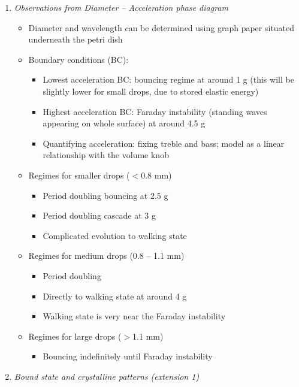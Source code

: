 \begin{enumerate}
\begin{enumerate}
\end{enumerate}


\item\textit{Observations from Diameter -- Acceleration phase diagram \cite{protiere2006particle}}


\begin{itemize}

\item  Diameter and wavelength can be determined using graph paper situated underneath the petri dish

\item  Boundary conditions (BC):
\begin{itemize}
\item  Lowest acceleration BC: bouncing regime at around 1 g (this will be  slightly lower for small drops, due to stored elastic energy)
\item  Highest acceleration BC: Faraday instability (standing waves appearing on whole surface) at around 4.5 g
\item  Quantifying acceleration: fixing treble and bass; model as a linear relationship with the volume knob
\end{itemize}

\item  Regimes for smaller drops ($<$0.8 mm)
\begin{itemize}
\item  Period doubling bouncing at 2.5 g
\item  Period doubling cascade at 3 g
\item  Complicated evolution to walking state
\end{itemize}
\item  Regimes for medium drops (0.8 -- 1.1 mm)
\begin{itemize}
\item  Period doubling
\item  Directly to walking state at around 4 g
\item  Walking state is very near the Faraday instability
\end{itemize}
\item  Regimes for large drops ($>$1.1 mm)
\begin{itemize}
\item  Bouncing indefinitely until Faraday instability
\end{itemize}
\end{itemize}

\item \textit{Bound state and crystalline patterns (extension 1)}


\end{enumerate}
